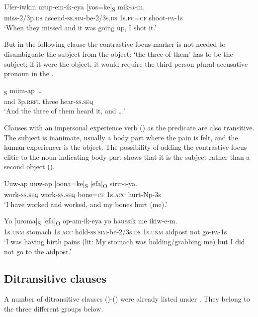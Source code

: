 \ea%
\label{ex:x938}
\gll Ufer-iwkin  urup-em-ik-eya  [yos=ke]\textsubscript{S}  mik-a-m. \\
     miss-2/3p.\textsc{ds}  ascend-\textsc{ss}.\textsc{sim}-be-2/3s.\textsc{ds}  1s.\textsc{fc}=\textsc{cf}  shoot-\textsc{pa}-1s \\
\glt `When they missed and it was going up, I shot it.'
\z

But in the following clause the contrastive focus marker is not needed to disambiguate the subject from the object:  `the three of them' has to be the subject; if it were the object, it would require the third person plural accusative pronoun  in the .

\ea%
\label{ex:x940}
\textsubscript{S}  miim-ap  {\dots} \\
     and  3p.\textsc{refl}  three  hear-\textsc{ss}.\textsc{seq} \\
\glt `And the three of them heard it, and {\dots}'
\z

Clauses with an impersonal experience verb () as the predicate are also transitive. The subject is inanimate, usually a body part where the pain is felt, and the human experiencer is the object. The possibility of adding the contrastive focus clitic to the noun indicating body part shows that it is the subject rather than a second object ().

\ea%
\label{ex:x1012}
\gll Uuw-ap  uuw-ap  [oona=ke]\textsubscript{S}  [efa]\textsubscript{O}  sirir-i-ya. \\
     work-\textsc{ss}.\textsc{seq}  work-\textsc{ss}.\textsc{seq}  bone=\textsc{cf}  1s.\textsc{acc}  hurt-Np-3s \\
\glt `I have worked and worked, and my bones hurt (me).'
\z

\ea%
\label{ex:x1015}
\gll Yo  [uroma]\textsubscript{S}  [efa]\textsubscript{O}  op-am-ik-eya  yo  haussik me  ikiw-e-m. \\
     1s.\textsc{unm}  stomach  1s.\textsc{acc}  hold-\textsc{ss}.\textsc{sim}-be-2/3s.\textsc{ds}  1s.\textsc{unm}  aidpost not  go-\textsc{pa}-1s \\
\glt `I was having birth pains (lit: My stomach was holding/grabbing me) but I did not go to the aidpost.'
\z

\subsection{Ditransitive clauses}
\hypertarget{RefHeading22001935131865}{}
A number of ditransitive clauses ()-() were already listed under . They belong to the three different groups below.

